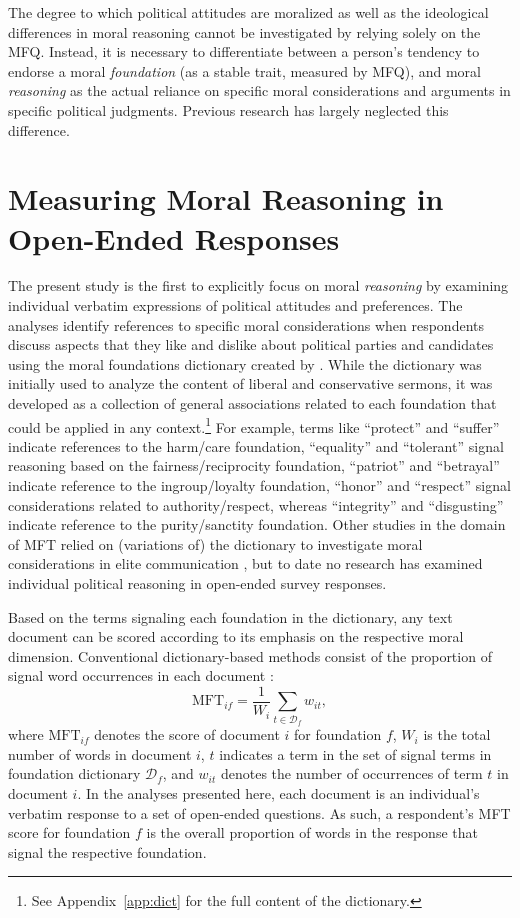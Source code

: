\documentclass[12pt]{article}
\begin{document}
The degree to which political attitudes are moralized as well as the ideological differences in moral reasoning cannot be investigated by relying solely on the MFQ. Instead, it is necessary to differentiate between a person's tendency to endorse a moral \textit{foundation} (as a stable trait, measured by MFQ), and moral \textit{reasoning} as the actual reliance on specific moral considerations and arguments in specific political judgments. Previous research has largely neglected this difference.


\section*{Measuring Moral Reasoning in Open-Ended Responses}

The present study is the first to explicitly focus on moral \textit{reasoning} by examining individual verbatim expressions of political attitudes and preferences. The analyses identify references to specific moral considerations when respondents discuss aspects that they like and dislike about political parties and candidates using the moral foundations dictionary created by \citet{graham2009liberals}. While the dictionary was initially used to analyze the content of liberal and conservative sermons, it was developed as a collection of general associations related to each foundation that could be applied in any context.\footnote{See Appendix~\ref{app:dict} for the full content of the dictionary.} For example, terms like ``protect'' and ``suffer'' indicate references to the harm/care foundation, ``equality'' and ``tolerant'' signal reasoning based on the fairness/reciprocity foundation, ``patriot'' and ``betrayal'' indicate reference to the ingroup/loyalty foundation, ``honor'' and ``respect'' signal considerations related to authority/respect, whereas ``integrity'' and ``disgusting'' indicate reference to the purity/sanctity foundation. Other studies in the domain of MFT relied on (variations of) the dictionary to investigate moral considerations in elite communication \citep[e.g. in news media coverage about stem cell research,][]{clifford2013words}, but to date no research has examined individual political reasoning in open-ended survey responses.

Based on the terms signaling each foundation in the dictionary, any text document can be scored according to its emphasis on the respective moral dimension. Conventional dictionary-based methods consist of the proportion of signal word occurrences in each document \citep[e.g.][]{graham2009liberals}:
\begin{equation}
\text{MFT}_{if} = \dfrac{1}{W_i} \sum_{t \in \mathcal{D}_f} w_{it},
\end{equation}
where $\text{MFT}_{if}$ denotes the score of document $i$ for foundation $f$, $W_i$ is the total number of words in document $i$, $t$ indicates a term in the set of signal terms in foundation dictionary $\mathcal{D}_f$, and $w_{it}$ denotes the number of occurrences of term $t$ in document $i$. In the analyses presented here, each document is an individual's verbatim response to a set of open-ended questions. As such, a respondent's MFT score for foundation $f$ is the overall proportion of words in the response that signal the respective foundation.
\end{document}
